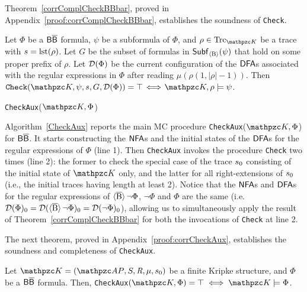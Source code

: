 Theorem~\ref{corrComplCheckBBbar}, proved in Appendix~\ref{proof:corrComplCheckBBbar}, establishes the soundness of \texttt{Check}.

\begin{theorem}\label{corrComplCheckBBbar}
Let $\Phi$ be a $\mathsf{B}\mathsf{\overline{B}}$ formula, $\psi$ be a subformula of $\Phi$, and $\rho\in\Trk_{\Ku}$ be a trace with $s=\operatorname{lst}(\rho)$. Let $G$ be the subset of formulas in $\mathsf{Subf}_{\operatorname{\langle B\rangle}}(\psi)$ that hold on some proper prefix of $\rho$.
Let $\mathcal{D}(\Phi)$ be the current configuration of the $\text{\sffamily DFA}$s associated with the regular expressions in $\Phi$ after reading $\mu(\rho(1,|\rho|-1))$.
%
Then $\texttt{Check}(\Ku,\psi,s,G,\Du(\Phi))=\top \!\iff\! \Ku,\rho\models \psi$.
\end{theorem}

\begin{algorithm}[tp]
    \caption{\texttt{CheckAux}($\Ku,\Phi$)}\label{CheckAux}
    \begin{algorithmic}[1]        
            \Return{$\bot$}
        \Else
            \Return{$\top$}  
        \EndIf
    \end{algorithmic}
\end{algorithm}

Algorithm~\ref{CheckAux} reports the main MC procedure \texttt{CheckAux}($\Ku,\Phi$) for $\mathsf{B}\mathsf{\overline{B}}$.  It starts constructing the $\text{\sffamily NFA}$s and the initial states of the $\text{\sffamily DFA}$s for the regular expressions of $\Phi$ (line 1). Then \texttt{CheckAux} invokes the procedure \texttt{Check} two times (line 2): the former to check the special case of the trace $s_0$ consisting of the initial state of $\Ku$ only, and the latter for all right-extensions of $s_0$ (i.e., the initial traces having length at least 2). 
Notice that the $\text{\sffamily NFA}$s and $\text{\sffamily DFA}$s for the regular expressions of $\operatorname{\langle \overline{B}\rangle}\neg\Phi$, $\neg\Phi$ and $\Phi$ are the same (i.e. $\mathcal{D}(\Phi)_0=\mathcal{D}(\operatorname{\langle \overline{B}\rangle}\neg\Phi)_0=\mathcal{D}(\neg\Phi)_0$), allowing us to simultaneously apply the result of Theorem~\ref{corrComplCheckBBbar} for both the invocations of \texttt{Check} at line 2.

The next theorem, proved in Appendix~\ref{proof:corrCheckAux}, establishes the soundness and completeness of \texttt{CheckAux}.
\begin{theorem}\label{corrCheckAux}
    Let $\Ku=\KuDef$ be a finite Kripke structure, and $\Phi$ be a $\mathsf{B}\mathsf{\overline{B}}$ formula. Then, \texttt{CheckAux}$(\Ku,\Phi)=\top\iff\Ku\models\Phi$.
\end{theorem}


